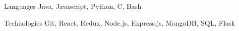 

\begin{cvskills}

  \cvskill
    {Languages} %
    {Java, Javascript, Python, C, Bash} %

  \cvskill
    {Technologies} %
    {Git, React, Redux, Node.js, Express.js, MongoDB, SQL, Flask} %

\end{cvskills}
